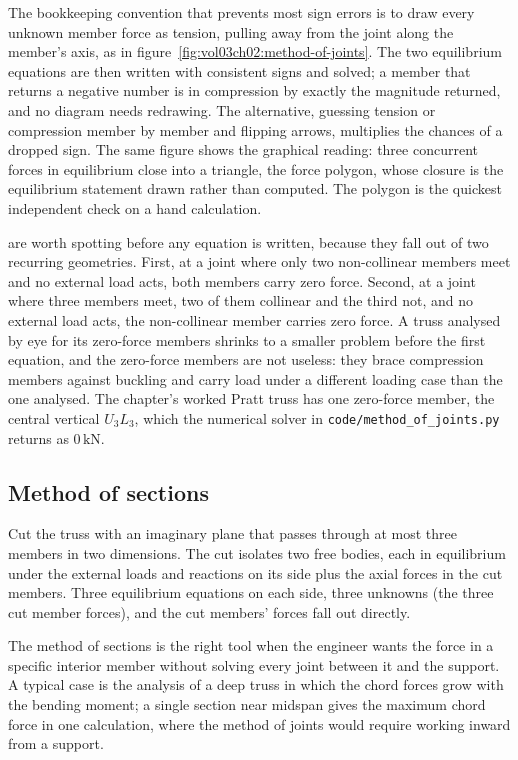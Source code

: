 

The bookkeeping convention that prevents most sign errors is to draw
every unknown member force as tension, pulling away from the joint
along the member's axis, as in
figure~\ref{fig:vol03ch02:method-of-joints}. The two equilibrium
equations are then written with consistent signs and solved; a member
that returns a negative number is in compression by exactly the
magnitude returned, and no diagram needs redrawing. The alternative,
guessing tension or compression member by member and flipping arrows,
multiplies the chances of a dropped sign. The same figure shows the
graphical reading: three concurrent forces in equilibrium close into a
triangle, the force polygon, whose closure is the equilibrium statement
drawn rather than computed. The polygon is the quickest independent
check on a hand calculation.

 are worth spotting before any equation is
written, because they fall out of two recurring geometries. First, at a
joint where only two non-collinear members meet and no external load
acts, both members carry zero force. Second, at a joint where three
members meet, two of them collinear and the third not, and no external
load acts, the non-collinear member carries zero force. A truss
analysed by eye for its zero-force members shrinks to a smaller problem
before the first equation, and the zero-force members are not useless:
they brace compression members against buckling and carry load under a
different loading case than the one analysed. The chapter's worked Pratt
truss has one zero-force member, the central vertical $U_3L_3$, which
the numerical solver in
\texttt{code/method\_of\_joints.py} returns as $0\,\text{kN}$.

\subsection{Method of sections}

Cut the truss with an imaginary plane that passes through at most
three members in two dimensions. The cut isolates two free bodies,
each in equilibrium under the external loads and reactions on its
side plus the axial forces in the cut members. Three equilibrium
equations on each side, three unknowns (the three cut member
forces), and the cut members' forces fall out directly.

The method of sections is the right tool when the engineer wants the
force in a specific interior member without solving every joint
between it and the support. A typical case is the analysis of a
deep truss in which the chord forces grow with the bending moment;
a single section near midspan gives the maximum chord force in one
calculation, where the method of joints would require working
inward from a support.

